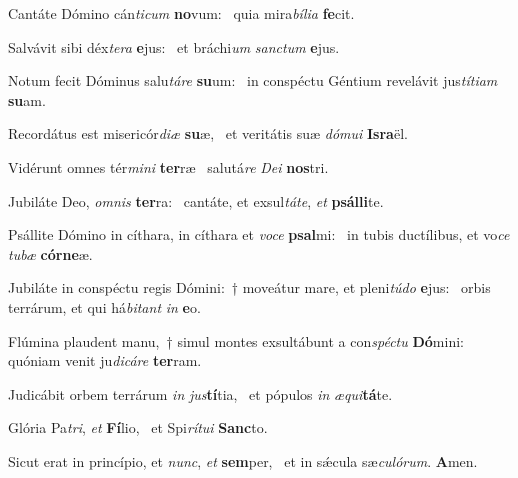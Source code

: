 \item Cantáte Dómino cán\textit{ticum} \textbf{no}vum:~\psstar{} quia mira\textit{bília} \textbf{fe}cit.
\item Salvávit sibi déx\textit{tera} \textbf{e}jus:~\psstar{} et bráchi\textit{um} \textit{sanctum} \textbf{e}jus.
\item Notum fecit Dóminus salu\textit{táre} \textbf{su}um:~\psstar{} in conspéctu Géntium revelávit jus\textit{títiam} \textbf{su}am.
\item Recordátus est misericór\textit{diæ} \textbf{su}æ,~\psstar{} et veritátis suæ \textit{dómui} \textbf{Is}\textbf{ra}ël.
\item Vidérunt omnes tér\textit{mini} \textbf{ter}ræ~\psstar{} salutá\textit{re} \textit{Dei} \textbf{nos}tri.
\item Jubiláte Deo, \textit{omnis} \textbf{ter}ra:~\psstar{} cantáte, et exsul\textit{táte}, \textit{et} \textbf{psál}\textbf{li}te.
\item Psállite Dómino in cíthara, in cíthara et \textit{voce} \textbf{psal}mi:~\psstar{} in tubis ductílibus, et vo\textit{ce} \textit{tubæ} \textbf{cór}\textbf{ne}æ.
\item Jubiláte in conspéctu regis Dómini:~† moveátur mare, et pleni\textit{túdo} \textbf{e}jus:~\psstar{} orbis terrárum, et qui há\textit{bitant} \textit{in} \textbf{e}o.
\item Flúmina plaudent manu,~† simul montes exsultábunt a con\textit{spéctu} \textbf{Dó}mini:~\psstar{} quóniam venit ju\textit{dicáre} \textbf{ter}ram.
\item Judicábit orbem terrárum \textit{in} \textit{jus}\textbf{tí}tia,~\psstar{} et pópulos \textit{in} \textit{æqui}\textbf{tá}te.
\item Glória Pa\textit{tri}, \textit{et} \textbf{Fí}lio,~\psstar{} et Spi\textit{rítui} \textbf{Sanc}to.
\item Sicut erat in princípio, et \textit{nunc}, \textit{et} \textbf{sem}per,~\psstar{} et in sǽcula sæ\textit{culórum}. \textbf{A}men.
